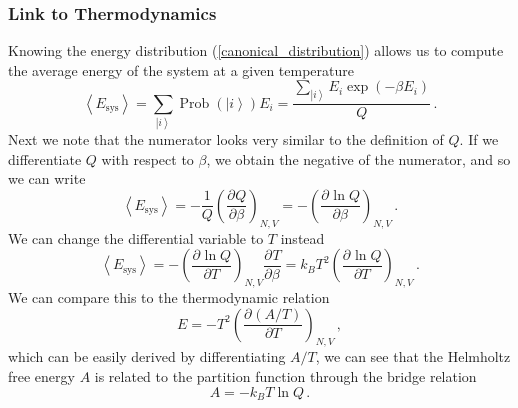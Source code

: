 \documentclass{article}
\theoremstyle{plain}\theoremheaderfont{\normalfont\bfseries}\theorembodyfont{\rmfamily}\theoremseparator{.}\newtheorem*{thm}{Theorem}\newtheorem*{law}{Law}\newtheorem*{pos}{Postulate}
\numberwithin{equation}{section}
\newcommand{\pdv}[3][]{\frac{\partial^{#1} #2}{{\partial #3}^{#1}}}
\newcommand{\ket}[1]{\left| #1 \right\rangle}
\newcommand{\eval}[1]{\left\langle #1 \right\rangle}
\newcommand{\sys}{\text{sys}}
\DeclareMathOperator{\Prob}{Prob}
\begin{document}
    \subsubsection{Link to Thermodynamics}
    Knowing the energy distribution (\ref{canonical_distribution}) allows us to compute the average energy of the system at a given temperature
    \begin{equation}
        \eval{E_{\sys}}=\sum_{\ket{i}}\Prob(\ket{i})E_i=\frac{\sum_{\ket{i}}E_i\exp(-\beta E_i)}{Q}\,.
    \end{equation}
    Next we note that the numerator looks very similar to the definition of \(Q\). If we differentiate \(Q\) with respect to \(\beta\), we obtain the negative of the numerator, and so we can write
    \begin{equation}
        \eval{E_{\sys}}=-\frac{1}{Q}\left(\pdv{Q}{\beta}\right)_{N,V}=-\left(\pdv{\ln{Q}}{\beta}\right)_{N,V}\,.
    \end{equation}
    We can change the differential variable to \(T\) instead
    \begin{equation}
        \eval{E_{\sys}}=-\left(\pdv{\ln Q}{T}\right)_{N,V}\pdv{T}{\beta}=k_B T^2\left(\pdv{\ln Q}{T}\right)_{N,V}\,.
    \end{equation}
    We can compare this to the thermodynamic relation
    \begin{equation}
        E=-T^2\left(\pdv{(A/T)}{T}\right)_{N,V}\,,
    \end{equation}
    which can be easily derived by differentiating \(A/T\), we can see that the Helmholtz free energy \(A\) is related to the partition function through the bridge relation
    \begin{equation}
        A=-k_BT\ln Q\,.
    \end{equation}
\end{document}
